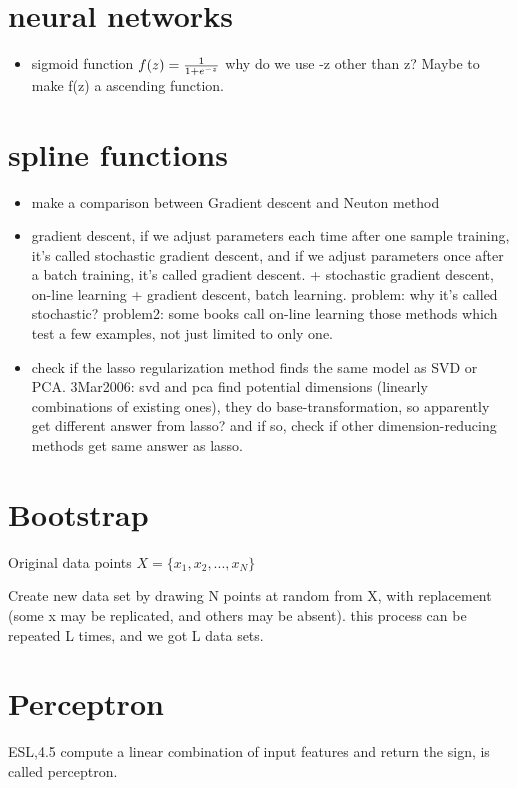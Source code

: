 \documentclass[10pt,a4paper]{book}
\begin{document}
\section {neural networks}
\begin{itemize}
\item sigmoid function  
$f(z) = {1 \over {1 + e^{-z}}}$  
why do we use -z other than z? Maybe to make f(z) a ascending function.
\end{itemize}

\section{spline functions}
\begin{itemize}


\item make a comparison between Gradient descent and Neuton method   
\item gradient descent, if we adjust parameters each time after one sample training, it's called stochastic gradient descent, and if we adjust parameters once after a batch training, it's called gradient descent.   
+ stochastic gradient descent, on-line learning   
+ gradient descent, batch learning.    
problem: why it's called stochastic?
problem2: some books call on-line learning those methods which test a few examples, not just limited to only one.   

\item check if the lasso regularization method finds the same model as SVD or PCA. 3Mar2006: svd and pca find potential dimensions (linearly combinations of existing ones), they do base-transformation, so apparently get different answer from lasso? and if so, check if other dimension-reducing methods get same answer as lasso.
\end{itemize}


\section{Bootstrap}
Original data points $X=\{x_1,x_2,...,x_N\}$

Create new data set by drawing N points at random from X, with replacement (some x may be replicated, and others may be absent). this process can be repeated L times, and we got L data sets.
\section {Perceptron}
ESL,4.5
compute a linear combination of input features and return the sign, is called perceptron.
\end{document}

